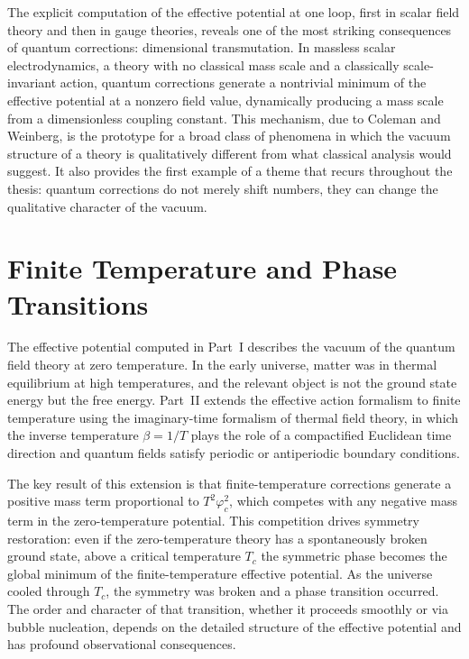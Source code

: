 The explicit computation of the effective potential at one loop, first
in scalar field theory and then in gauge theories, reveals one of the
most striking consequences of quantum corrections: dimensional
transmutation. In massless scalar electrodynamics, a theory with no
classical mass scale and a classically scale-invariant action, quantum
corrections generate a nontrivial minimum of the effective potential
at a nonzero field value, dynamically producing a mass scale from
a dimensionless coupling constant. This mechanism, due to Coleman and
Weinberg, is the prototype for a broad class of phenomena in which
the vacuum structure of a theory is qualitatively different from what
classical analysis would suggest. It also provides the first example
of a theme that recurs throughout the thesis: quantum corrections do
not merely shift numbers, they can change the qualitative character
of the vacuum.

\section*{Finite Temperature and Phase Transitions}

The effective potential computed in Part~I describes the vacuum of the
quantum field theory at zero temperature. In the early universe, matter
was in thermal equilibrium at high temperatures, and the relevant
object is not the ground state energy but the free energy. Part~II
extends the effective action formalism to finite temperature using the
imaginary-time formalism of thermal field theory, in which the inverse
temperature $\beta = 1/T$ plays the role of a compactified Euclidean
time direction and quantum fields satisfy periodic or antiperiodic
boundary conditions.

The key result of this extension is that finite-temperature
corrections generate a positive mass term proportional to $T^2\varphi_c^2$,
which competes with any negative mass term in the zero-temperature
potential. This competition drives symmetry restoration: even if the
zero-temperature theory has a spontaneously broken ground state, above
a critical temperature $T_c$ the symmetric phase becomes the global
minimum of the finite-temperature effective potential. As the universe
cooled through $T_c$, the symmetry was broken and a phase transition
occurred. The order and character of that transition, whether it
proceeds smoothly or via bubble nucleation, depends on the detailed
structure of the effective potential and has profound observational
consequences.

